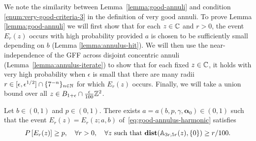 \documentclass[12pt]{amsart}
\numberwithin{equation}{section}
\begin{document}
	We note the similarity between Lemma~\ref{lemma:good-annuli} and condition \ref{enum:very-good-criteria-3} in the definition of very good annuli.
	To prove Lemma \ref{lemma:good-annuli} we will first show that for each $z \in \mathbb{C}$ and $r > 0$, the event $E_r(z)$ occurs 
	with high probability provided $a$ is chosen to be sufficiently small depending on $b$ (Lemma \ref{lemma:annulus-hit}).
	We will then use the near-independence of the GFF across disjoint concentric annuli (Lemma~\ref{lemma:annulus-iterate}) 
	to show that for each fixed $z \in \mathbb{C}$, it holds with very high probability when $\epsilon$ is small 
	that there are many radii $r \in [\epsilon, \epsilon^{1/2}] \cap \{7^{-n}\}_{n \in \mathbb{N}}$ for which $E_r(z)$ occurs. 
	Finally, we will take a union bound over all $z \in B_{1 + \epsilon} \cap \frac{\epsilon}{100} \mathbb{Z}^2$. 
	
	
	\begin{lemma} \label{lemma:annulus-hit}
		Let $b \in (0,1)$ and $p \in (0,1)$. There exists $a = a(b,p,\gamma,\boldsymbol{\alpha}_0) \in (0,1)$ such that the event $E_r(z) = E_r(z;a,b)$ of~\eqref{eq:good-annulus-harmonic} satisfies 
		\[
		P\left[ E_r(z) \right] \geq p ,\quad \forall r > 0,\quad \forall z \mbox{ such that $\mathop{\bf dist{}}(\mathbb{A}_{3 r, 5 r}(z), \{0\}) \geq r/100$}.
		\]
	\end{lemma}
	
\end{document}
